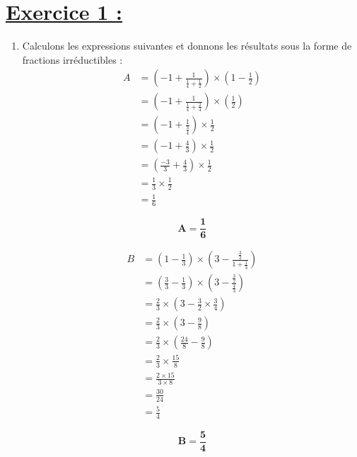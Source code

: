 \documentclass[12pt,a4paper]{article}
\begin{document}
\section*{\underline{Exercice 1 :}}
\begin{enumerate}
\item Calculons les expressions suivantes et donnons les résultats sous la forme de fractions irréductibles :
\[
\begin{aligned}
    A &= \left( -1 + \frac{1}{\frac{1}{4} + \frac{1}{2}} \right) \times \left( 1 - \frac{1}{2} \right) \\[6pt]
    &= \left( -1 + \frac{1}{\frac{1}{4} + \frac{2}{4}} \right) \times \left( \frac{1}{2} \right) \\[6pt]
    &= \left( -1 + \frac{1}{\frac{3}{4}} \right) \times \frac{1}{2} \\[6pt]
    &= \left( -1 + \frac{4}{3} \right) \times \frac{1}{2} \\[6pt]
    &= \left( \frac{-3}{3} + \frac{4}{3} \right) \times \frac{1}{2} \\[6pt]
    &= \frac{1}{3} \times \frac{1}{2} \\[6pt]
    &= \frac{1}{6}
\end{aligned}
\]
\begin{tcolorbox}[colback=yellow!20, colframe=black, sharp corners]
    \[
    \mathbf{A = \frac{1}{6}}
    \]
\end{tcolorbox}
\[
\begin{aligned}
    B &= \left( 1 - \frac{1}{3} \right) \times \left( 3 - \frac{\frac{3}{2}}{1 + \frac{1}{3}} \right) \\[6pt]
    &= \left( \frac{3}{3} - \frac{1}{3} \right) \times \left( 3 - \frac{\frac{3}{2}}{\frac{4}{3}} \right) \\[6pt]
    &= \frac{2}{3} \times \left( 3 - \frac{3}{2} \times \frac{3}{4} \right) \\[6pt]
    &= \frac{2}{3} \times \left( 3 - \frac{9}{8} \right) \\[6pt]
    &= \frac{2}{3} \times \left( \frac{24}{8} - \frac{9}{8} \right) \\[6pt]
    &= \frac{2}{3} \times \frac{15}{8} \\[6pt]
    &= \frac{2 \times 15}{3 \times 8} \\[6pt]
    &= \frac{30}{24} \\[6pt]
    &= \frac{5}{4}
\end{aligned}
\]

\begin{tcolorbox}[colback=yellow!20, colframe=black, sharp corners]
    \[
    \mathbf{B = \frac{5}{4}}
    \]
\end{tcolorbox}


\end{enumerate}
\end{document}
